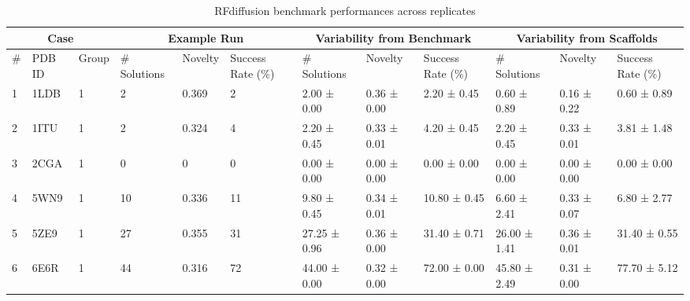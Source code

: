 \begin{table}[H]
\centering
\caption{RFdiffusion benchmark performances across replicates}
\label{table:RFdiff_replicates}
\footnotesize
\resizebox{\linewidth}{!}
{
\begin{threeparttable}
\begin{tabular}{|p{0.3cm}|p{0.8cm}|p{0.2cm}|p{0.9cm}|p{0.9cm}|p{0.8cm}|p{1.6cm}|p{1.5cm}|p{1.7cm}|p{1.6cm}|p{1.5cm}|p{1.7cm}|}
\hline
\multicolumn{3}{|c|}{\textbf{Case}}               & \multicolumn{3}{c|}{\textbf{Example Run}}                            & \multicolumn{3}{c|}{\textbf{Variability from Benchmark}\tnote{*}} & \multicolumn{3}{c|}{\textbf{Variability from Scaffolds}\tnote{*}}  \\ 
\hline
\# & PDB ID & Group & \# Solutions & Novelty & Success Rate (\%) & \# Solutions & Novelty & Success Rate (\%) & \# Solutions & Novelty & Success Rate (\%) \\ 
\hline
1           & 1LDB            & 1                 & 2                         & 0.369            & 2                     & 2.00 ± 0.00           & 0.36 ± 0.00      & 2.20 ± 0.45                       & 0.60 ± 0.89           & 0.16 ± 0.22      & 0.60 ± 0.89                        \\
2           & 1ITU            & 1                 & 2                         & 0.324            & 4                     & 2.20 ± 0.45           & 0.33 ± 0.01      & 4.20 ± 0.45                       & 2.20 ± 0.45           & 0.33 ± 0.01      & 3.81 ± 1.48                        \\
3           & 2CGA            & 1                 & 0                         & 0                & 0                     & 0.00 ± 0.00           & 0.00 ± 0.00      & 0.00 ± 0.00                       & 0.00 ± 0.00           & 0.00 ± 0.00      & 0.00 ± 0.00                        \\
4           & 5WN9            & 1                 & 10                        & 0.336            & 11                    & 9.80 ± 0.45           & 0.34 ± 0.01      & 10.80 ± 0.45                      & 6.60 ± 2.41           & 0.33 ± 0.07      & 6.80 ± 2.77                        \\
5           & 5ZE9            & 1                 & 27                        & 0.355             & 31                    & 27.25 ± 0.96          & 0.36 ± 0.00      & 31.40 ± 0.71 & 26.00 ± 1.41 & 0.36 ± 0.01      & 31.40 ± 0.55                       \\
6           & 6E6R            & 1                 & 44                        & 0.316            & 72                    & 44.00 ± 0.00          & 0.32 ± 0.00      & 72.00 ± 0.00                      & 45.80 ± 2.49          & 0.31 ± 0.00      & 77.70 ± 5.12                       \\

\end{tabular}
\end{threeparttable}}
\end{table}
